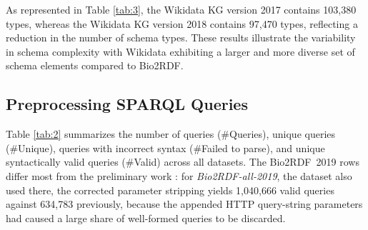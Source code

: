 \documentclass[sw]{iosart2x}
\providecommand{\DIFaddbeginFL}{} %
\providecommand{\DIFaddendFL}{} %
\providecommand{\DIFdelbeginFL}{} %
\providecommand{\DIFdelendFL}{} %
\providecommand{\DIFscaledelfig}{0.5}
\newlength{\DIFdelgraphicswidth} %
\newlength{\DIFdelgraphicsheight} %
\providecommand{\DIFaddincludegraphics}[2][]{{\color{blue}\fbox{\DIFOincludegraphics[#1]{#2}}}} %
\providecommand{\DIFdelincludegraphics}[2][]{%
\sbox{\DIFdelgraphicsbox}{\DIFOincludegraphics[#1]{#2}}%
\settoboxwidth{\DIFdelgraphicswidth}{\DIFdelgraphicsbox} %
\settoboxtotalheight{\DIFdelgraphicsheight}{\DIFdelgraphicsbox} %
\scalebox{\DIFscaledelfig}{%
\parbox[b]{\DIFdelgraphicswidth}{\usebox{\DIFdelgraphicsbox}\\[-\baselineskip] \rule{\DIFdelgraphicswidth}{0em}}\llap{\resizebox{\DIFdelgraphicswidth}{\DIFdelgraphicsheight}{%
\setlength{\unitlength}{\DIFdelgraphicswidth}%
\begin{picture}(1,1)%
\thicklines\linethickness{2pt} %
{\color[rgb]{1,0,0}\put(0,0){\framebox(1,1){}}}%
{\color[rgb]{1,0,0}\put(0,0){\line( 1,1){1}}}%
{\color[rgb]{1,0,0}\put(0,1){\line(1,-1){1}}}%
\end{picture}%
}\hspace*{3pt}}} %
} %
\DeclareRobustCommand{\DIFaddbeginFL}{\DIFOaddbeginFL \let\includegraphics\DIFaddincludegraphics} %
\DeclareRobustCommand{\DIFaddendFL}{\DIFOaddendFL \let\includegraphics\DIFOincludegraphics} %
\DeclareRobustCommand{\DIFdelbeginFL}{\DIFOdelbeginFL \let\includegraphics\DIFdelincludegraphics} %
\DeclareRobustCommand{\DIFdelendFL}{\DIFOaddendFL \let\includegraphics\DIFOincludegraphics} %
\begin{document}
As represented in Table \ref{tab:3}, the Wikidata KG version 2017 contains 103,380 types, whereas the Wikidata KG version 2018 contains 97,470 types, reflecting a reduction in the number of schema types. These results illustrate the variability in schema complexity with Wikidata exhibiting a larger and more diverse set of schema elements compared to Bio2RDF.
\begin{table}[ht]
\centering
\caption{Total schema elements Statistics per KG version}
\label{tab:3}
\DIFdelbeginFL %
\DIFdelendFL \DIFaddbeginFL {}
\DIFaddendFL \end{table}


\subsection{Preprocessing SPARQL Queries}
Table \ref{tab:2} summarizes the number of queries (\#Queries), unique queries (\#Unique), queries with incorrect syntax (\#Failed to parse), and unique syntactically valid queries (\#Valid) across all datasets. The Bio2RDF~2019 rows differ most from the preliminary work \cite{mohammadi2024analyzing}: for \emph{Bio2RDF-all-2019}, the dataset also used there, the corrected parameter stripping yields 1{,}040{,}666 valid queries against 634{,}783 previously, because the appended HTTP query-string parameters had caused a large share of well-formed queries to be discarded.
\end{document}
